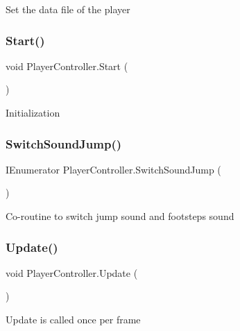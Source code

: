 Set the data file of the player \mbox{\label{class_player_controller_ae1117d9c4da3193181cddad2c814e467}} 
\subsubsection{\texorpdfstring{Start()}{Start()}}
{\footnotesize\ttfamily void Player\+Controller.\+Start (\begin{DoxyParamCaption}{ }\end{DoxyParamCaption})\hspace{0.3cm}{\ttfamily [private]}}

Initialization \mbox{\label{class_player_controller_a9aea955a866a4a9285cceae7c9dbffdb}} 
\subsubsection{\texorpdfstring{Switch\+Sound\+Jump()}{SwitchSoundJump()}}
{\footnotesize\ttfamily I\+Enumerator Player\+Controller.\+Switch\+Sound\+Jump (\begin{DoxyParamCaption}{ }\end{DoxyParamCaption})\hspace{0.3cm}{\ttfamily [private]}}

Co-\/routine to switch jump sound and footsteps sound \mbox{\label{class_player_controller_ae8bc83dffb99867a04be016473ed2c43}} 
\subsubsection{\texorpdfstring{Update()}{Update()}}
{\footnotesize\ttfamily void Player\+Controller.\+Update (\begin{DoxyParamCaption}{ }\end{DoxyParamCaption})\hspace{0.3cm}{\ttfamily [private]}}

Update is called once per frame 

